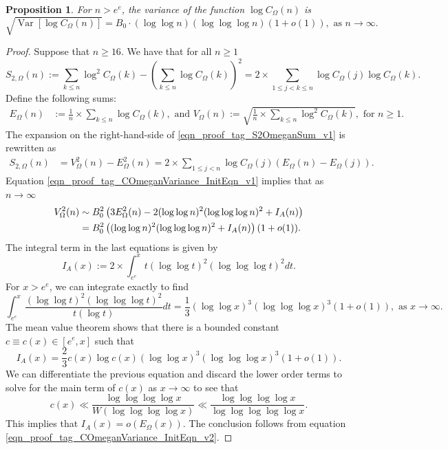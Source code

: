 \documentclass[11pt,reqno,a4letter]{article}
\numberwithin{equation}{section}
\numberwithin{figure}{section}
\numberwithin{table}{section}
\theoremstyle{plain}
\newtheorem{prop}[theorem]{Proposition}
\numberwithin{theorem}{section}
\theoremstyle{definition}
\begin{document}
\begin{prop}
\label{prop_VarianceStat_for_COmegan_v1}
\label{prop_COmeganFunc_Variance_v1}
For $n > e^e$, the variance of the function $\log C_{\Omega}(n)$ is
\[
\sqrt{\operatorname{Var}\left[\log C_{\Omega}(n)\right]} = 
	B_0 \cdot (\log\log n) (\log\log\log n) \left(1 + o(1)\right), 
	\text{ as } n \rightarrow \infty. 
\]
\end{prop}
\begin{proof}
Suppose that $n \geq 16$. We have that for all $n \geq 1$  
\begin{equation}
\label{eqn_proof_tag_S2OmeganSum_v1}
S_{2,\Omega}(n) := \sum_{k \leq n} \log^2 C_{\Omega}(k) - 
     \left(\sum_{k \leq n} \log C_{\Omega}(k)\right)^2 = 
	2 \times \sum_{1 \leq j < k \leq n} \log C_{\Omega}(j) \log C_{\Omega}(k).
\end{equation}
Define the following sums:  
\begin{align*}
E_{\Omega}(n) & := \frac{1}{n} \times \sum_{k \leq n} \log C_{\Omega}(k), 
     \text{ and } 
V_{\Omega}(n) := \sqrt{\frac{1}{n} \times \sum_{k \leq n} \log^2 C_{\Omega}(k)}, 
	\text{ for } n \geq 1. 
\end{align*}
The expansion on the right-hand-side of \eqref{eqn_proof_tag_S2OmeganSum_v1} is rewritten as 
\begin{align}
\label{eqn_proof_tag_COmeganVariance_InitEqn_v1}
S_{2,\Omega}(n) & = V_{\Omega}^2(n) - E_{\Omega}^2(n) = 
     2 \times \sum_{1 \leq j < n} \log C_{\Omega}(j) \left(
     E_{\Omega}(n) - E_{\Omega}(j)\right). 
\end{align} 
Equation \eqref{eqn_proof_tag_COmeganVariance_InitEqn_v1} implies that as $n \rightarrow \infty$ 
\begin{align}
\notag
V_{\Omega}^2(n) & \sim B_0^2 \left(3E_{\Omega}^2(n) - 
	2 (\log\log n)^2 (\log\log\log n)^2 + I_A(n)\right) \\ 
\label{eqn_proof_tag_COmeganVariance_InitEqn_v2}
	& =  B_0^2 \left((\log\log n)^2 (\log\log\log n)^2 + I_A(n)\right) (1+o(1)). 
\end{align} 
The integral term in the last equations is given by 
\[
I_A(x) := 2 \times \int_{e^e}^x t (\log\log t)^2 (\log\log\log t)^2 dt. 
\]
For $x > e^e$, we can integrate exactly to find 
\[
\int_{e^e}^x \frac{(\log\log t)^2 (\log\log\log t)^2}{t(\log t)} dt = 
	\frac{1}{3} (\log\log x)^3 (\log\log\log x)^3 (1+o(1)), 
	\text{ as } x \rightarrow \infty. 
\]
The mean value theorem shows that there is a bounded constant 
$c \equiv c(x) \in [e^e, x]$ such that 
\[
I_A(x) = \frac{2}{3} c(x) \log c(x) (\log\log x)^3 (\log\log\log x)^3 (1+o(1)). 
\]
We can differentiate the previous equation and discard the lower order terms to solve 
for the main term of $c(x)$ as $x \rightarrow \infty$ to see that 
\[
c(x) \ll \frac{\log\log\log\log x}{W\left(\log\log\log\log x\right)} \ll 
	\frac{\log\log\log\log x}{\log\log\log\log\log x}.
\]
This implies that $I_A(x) = o\left(E_{\Omega}(x)\right)$. 
The conclusion follows from equation \eqref{eqn_proof_tag_COmeganVariance_InitEqn_v2}. 
\end{proof}
\end{document}
